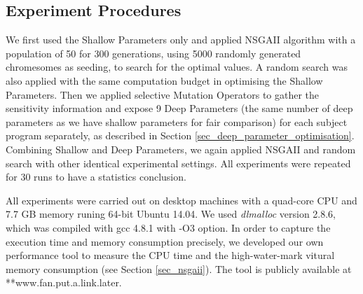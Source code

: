 \subsection{Experiment Procedures}

We first used the Shallow Parameters only and applied NSGAII algorithm with a population of 50 for 300 generations, using 5000 randomly generated chromesomes as seeding, to search for the optimal values. A random search was also applied with the same computation budget in optimising the Shallow Parameters. Then we applied selective Mutation Operators to gather the sensitivity information and expose 9 Deep Parameters (the same number of deep parameters as we have shallow parameters for fair comparison) for each subject program separately, as described in Section \ref{sec_deep_parameter_optimisation}. Combining Shallow and Deep Parameters, we again applied NSGAII and random search with other identical experimental settings. All experiments were repeated for 30 runs to have a statistics conclusion.

All experiments were carried out on desktop machines with a quad-core CPU and 7.7 GB memory runing 64-bit Ubuntu 14.04. We used \emph{dlmalloc} version 2.8.6, which was compiled with gcc 4.8.1 with -O3 option. In order to capture the execution time and memory consumption precisely, we developed our own performance tool to measure the CPU time and the high-water-mark vitural memory consumption (see Section \ref{sec_nsgaii}). The tool is publicly available at **www.fan.put.a.link.later.

